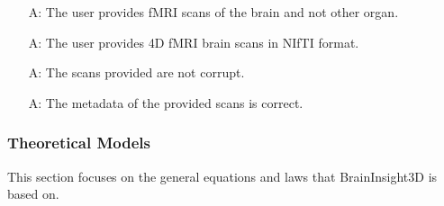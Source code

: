 \documentclass[12pt]{article}
\newcounter{assumpnum} %
\begin{document}
\begin{itemize}

  \item[A\refstepcounter{assumpnum}\theassumpnum \label{A1}:] The user provides fMRI scans of the brain and not other organ.
  \item[A\refstepcounter{assumpnum}\theassumpnum \label{A2}:] The user provides 4D fMRI brain scans in NIfTI format.
  \item[A\refstepcounter{assumpnum}\theassumpnum \label{A3}:] The scans provided are not corrupt.
  \item[A\refstepcounter{assumpnum}\theassumpnum \label{A4}:] The metadata of the provided scans is correct.


\end{itemize}

\subsubsection{Theoretical Models}\label{sec_theoretical}

This section focuses on the general equations and laws that BrainInsight3D is based
on.

~\newline
\end{document}

